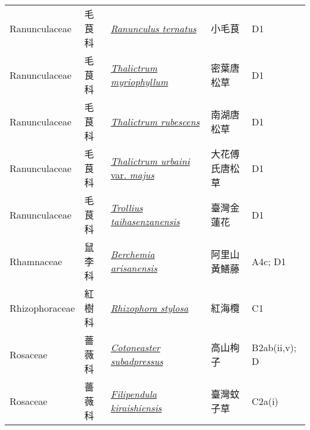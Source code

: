{\begin{longtable}{L{2.5cm}L{2cm}L{5cm}L{2.5cm}L{3cm}}
    Ranunculaceae & 毛茛科 & \href{http://www.theplantlist.org/tpl1.1/search?q=Ranunculus+ternatus}{\textit{Ranunculus ternatus} } & 小毛茛 & D1    \\
    Ranunculaceae & 毛茛科 & \href{http://www.theplantlist.org/tpl1.1/search?q=Thalictrum+myriophyllum}{\textit{Thalictrum myriophyllum} } & 密葉唐松草 & D1    \\
    Ranunculaceae & 毛茛科 & \href{http://www.theplantlist.org/tpl1.1/search?q=Thalictrum+rubescens}{\textit{Thalictrum rubescens} } & 南湖唐松草 & D1    \\
    Ranunculaceae & 毛茛科 & \href{http://www.theplantlist.org/tpl1.1/search?q=Thalictrum+urbaini+var.+majus}{\textit{Thalictrum urbaini} var. \textit{majus} } & 大花傅氏唐松草 & D1    \\
    Ranunculaceae & 毛茛科 & \href{http://www.theplantlist.org/tpl1.1/search?q=Trollius+taihasenzanensis}{\textit{Trollius taihasenzanensis} } & 臺灣金蓮花 & D1    \\
    Rhamnaceae & 鼠李科 & \href{http://www.theplantlist.org/tpl1.1/search?q=Berchemia+arisanensis}{\textit{Berchemia arisanensis} } & 阿里山黃鱔藤 & A4c; D1    \\
    Rhizophoraceae & 紅樹科 & \href{http://www.theplantlist.org/tpl1.1/search?q=Rhizophora+stylosa}{\textit{Rhizophora stylosa} } & 紅海欖 & C1    \\
    Rosaceae & 薔薇科 & \href{http://www.theplantlist.org/tpl1.1/search?q=Cotoneaster+subadpressus}{\textit{Cotoneaster subadpressus} } & 高山栒子 & B2ab(ii,v); D    \\
    Rosaceae & 薔薇科 & \href{http://www.theplantlist.org/tpl1.1/search?q=Filipendula+kiraishiensis}{\textit{Filipendula kiraishiensis} } & 臺灣蚊子草 & C2a(i)    \\

\end{longtable}}
